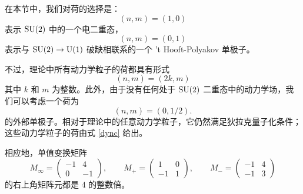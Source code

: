 在本节中，我们对荷的选择是：
\begin{equation}
(n,m)=(1,0)
\end{equation}
表示 $\mathop{\mathrm{SU}}(2)$ 中的一个电二重态，
\begin{equation}
(n,m)=(0,1)
\end{equation}
表示与 $\mathop{\mathrm{SU}}(2)\to{\mathrm{U}}(1)$ 破缺相联系的一个 't Hooft-Polyakov 单极子。

不过，理论中所有动力学粒子的荷都具有形式
\begin{equation}
(n,m)=(2k,m)\label{dync}
\end{equation}
其中 $k$ 和 $m$ 为整数。此外，由于没有任何处于 $\mathop{\mathrm{SU}}(2)$ 二重态中的动力学场，我们可以考虑一个荷为
\begin{equation}
(n,m)=(0,1/2).
\end{equation}
的外部单极子。相对于理论中的任意动力学粒子，它仍然满足狄拉克量子化条件；这些动力学粒子的荷由式 \eqref{dync} 给出。

相应地，单值变换矩阵
\begin{equation}
M_\infty=\begin{pmatrix}
-1 & 4 \\
0 & -1
\end{pmatrix},\qquad
M_+=\begin{pmatrix}
1 & 0 \\
-1 & 1
\end{pmatrix},\qquad
M_-=\begin{pmatrix}
-1 & 4 \\
-1 & 3
\end{pmatrix}
\end{equation}
的右上角矩阵元都是 $4$ 的整数倍。


